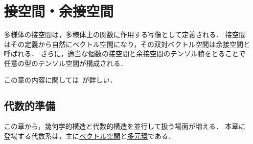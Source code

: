 \documentclass[geometry_main]{subfiles}
\begin{document}
\setcounter{chapter}{2}


\chapter{接空間・余接空間}
\label{chap3}

多様体の接空間は，多様体上の\cinfty 関数に作用する写像として定義される．
接空間はその定義から自然にベクトル空間になり，その双対ベクトル空間は余接空間と呼ばれる．
さらに，適当な個数の接空間と余接空間のテンソル積をとることで任意の型のテンソル空間が構成される．

この章の内容に関しては~\cite[Chapter3, 8, 11, 12]{Lee12}が詳しい．

\section{代数的準備}

この章から，幾何学的構造と代数的構造を並行して扱う場面が増える．
本章に登場する代数系は，主に\hyperref[ax.vector]{ベクトル空間}と\hyperref[ax.alg]{多元環}である．
\end{document}
